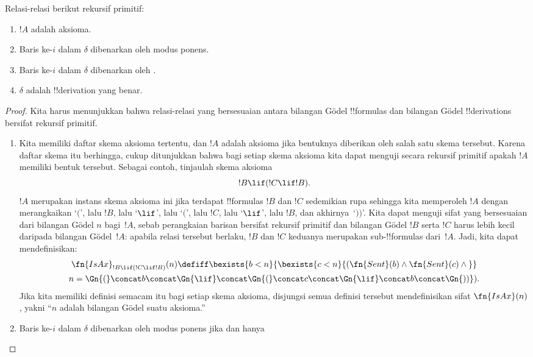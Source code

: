 \documentclass[../../../include/open-logic-section]{subfiles}
\begin{document}
\begin{prop}
Relasi-relasi berikut rekursif primitif:
\begin{enumerate}
\item $!A$ adalah aksioma.
\item Baris ke-$i$ dalam $\delta$ dibenarkan oleh modus ponens.
\item Baris ke-$i$ dalam $\delta$ dibenarkan oleh \QR.
\item $\delta$ adalah !!{derivation} yang benar.
\end{enumerate}
\end{prop}

\begin{proof}
Kita harus menunjukkan bahwa relasi-relasi yang bersesuaian antara bilangan
G\"odel !!{formula}s dan bilangan G\"odel !!{derivation}s bersifat rekursif
primitif.
\begin{enumerate}
\item Kita memiliki daftar skema aksioma tertentu, dan $!A$ adalah aksioma
  jika bentuknya diberikan oleh salah satu skema tersebut. Karena daftar skema
  itu berhingga, cukup ditunjukkan bahwa bagi setiap skema aksioma kita dapat
  menguji secara rekursif primitif apakah $!A$ memiliki bentuk tersebut.
  Sebagai contoh, tinjaulah skema aksioma
  \[
  !B \lif (!C \lif !B).
  \]
  $!A$ merupakan instans skema aksioma ini jika terdapat !!{formula}s $!B$
  dan $!C$ sedemikian rupa sehingga kita memperoleh $!A$ dengan merangkaikan
  `$($', lalu $!B$, lalu `$\lif$', lalu `$($', lalu $!C$, lalu `$\lif$', lalu
  $!B$, dan akhirnya~`$))$'. Kita dapat menguji sifat yang bersesuaian dari
  bilangan G\"odel $n$ bagi~$!A$, sebab perangkaian barisan bersifat rekursif
  primitif dan bilangan G\"odel $!B$ serta $!C$ harus lebih kecil daripada
  bilangan G\"odel~$!A$: apabila relasi tersebut berlaku, $!B$ dan $!C$
  keduanya merupakan sub-!!{formula}s dari~$!A$. Jadi, kita dapat
  mendefinisikan:
  \begin{multline*}
  \fn{IsAx}_{!B \lif (!C \lif !B)}(n) \defiff \bexists{b< n}{
    \bexists{c < n}{(\fn{Sent}(b) \land \fn{Sent}(c) \land {}}}\\ n =
  \Gn{(} \concat b \concat \Gn{\lif} \concat \Gn{(} \concat c \concat
  \Gn{\lif} \concat b \concat \Gn{))}).
  \end{multline*}
  Jika kita memiliki definisi semacam itu bagi setiap skema aksioma,
  disjungsi semua definisi tersebut mendefinisikan sifat $\fn{IsAx}(n)$,
  yakni ``$n$ adalah bilangan G\"odel suatu aksioma.''
\item Baris ke-$i$ dalam $\delta$ dibenarkan oleh modus ponens jika dan hanya

\end{enumerate}
\end{proof}
\end{document}
